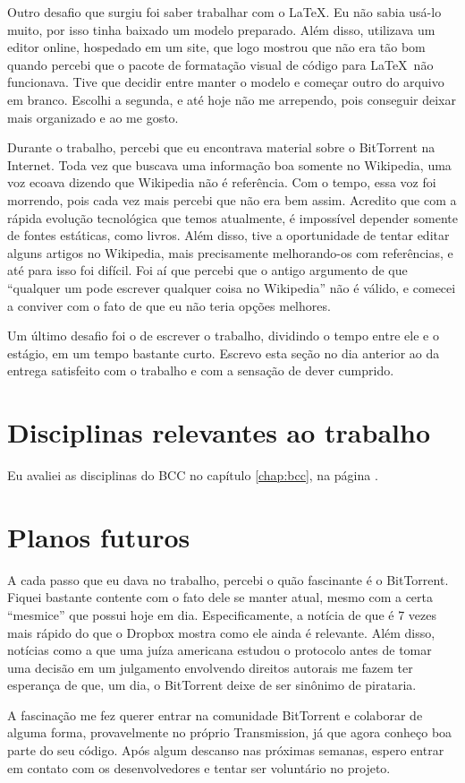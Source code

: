 Outro desafio que surgiu foi saber trabalhar com o \LaTeX. Eu não sabia usá-lo muito,
por isso tinha baixado um modelo preparado. Além disso, utilizava um editor online,
hospedado em um site, que logo mostrou que não era tão bom quando percebi que o pacote
de formatação visual de código para \LaTeX\, não funcionava. Tive que decidir entre
manter o modelo e começar outro do arquivo em branco. Escolhi a segunda, e até hoje não
me arrependo, pois conseguir deixar mais organizado e ao me gosto.

Durante o trabalho, percebi que eu encontrava material sobre o BitTorrent na Internet.
Toda vez que buscava uma informação boa somente no Wikipedia, uma voz ecoava dizendo que
Wikipedia não é referência. Com o tempo, essa voz foi morrendo, pois cada vez mais
percebi que não era bem assim. Acredito que com a rápida evolução tecnológica que temos
atualmente, é impossível depender somente de fontes estáticas, como livros. Além disso,
tive a oportunidade de tentar editar alguns artigos no Wikipedia, mais precisamente
melhorando-os com referências, e até para isso foi difícil. Foi aí que percebi que o
antigo argumento de que ``qualquer um pode escrever qualquer coisa no Wikipedia'' não é
válido, e comecei a conviver com o fato de que eu não teria opções melhores.

Um último desafio foi o de escrever o trabalho, dividindo o tempo entre ele e o
estágio, em um tempo bastante curto. Escrevo esta seção no dia anterior ao da entrega
satisfeito com o trabalho e com a sensação de dever cumprido.

\section*{Disciplinas relevantes ao trabalho}

Eu avaliei as disciplinas do BCC no capítulo \ref{chap:bcc}, na página \pageref{chap:bcc}.

\section*{Planos futuros}

A cada passo que eu dava no trabalho, percebi o quão fascinante é o BitTorrent. Fiquei
bastante contente com o fato dele se manter atual, mesmo com a certa ``mesmice'' que
possui hoje em dia. Especificamente, a notícia de que é 7 vezes mais rápido do que o
Dropbox \cite{site:torrentvsdropbox} mostra como ele ainda é relevante. Além disso,
notícias como a que uma juíza americana estudou o protocolo antes de tomar uma decisão
em um julgamento envolvendo direitos autorais \cite{site:juizamanjona} me fazem ter
esperança de que, um dia, o BitTorrent deixe de ser sinônimo de pirataria.

A fascinação me fez querer entrar na comunidade BitTorrent e colaborar de alguma
forma, provavelmente no próprio Transmission, já que agora conheço boa parte do seu
código. Após algum descanso nas próximas semanas, espero entrar em contato com os
desenvolvedores e tentar ser voluntário no projeto.



\afterpage{\clearpage}